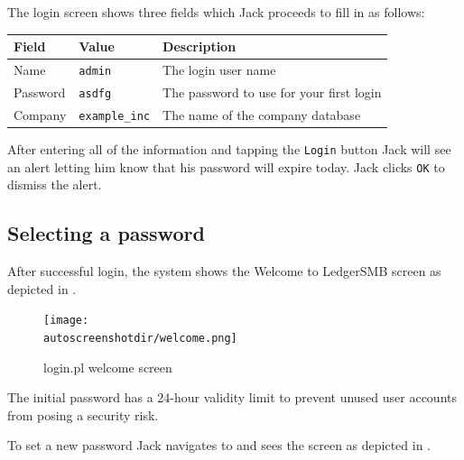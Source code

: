 The login screen shows three fields which Jack proceeds to fill in as follows:

\begin{longtable}{ llp{6cm} }
        Field & Value & Description \\ \hline
        \endhead
        Name & \texttt{admin} & The login user name\\
        Password & \texttt{asdfg} & The password to use for your first login\\
        Company & \texttt{example\_inc} & The name of the company database \\
\end{longtable}


After entering all of the information and tapping the \texttt{Login} button Jack will see an alert letting
him know that his password will expire today.  Jack clicks \texttt{OK} to dismiss the alert.

\subsection{Selecting a password}
\label{subsec-first-login-password}

After successful login, the system shows the Welcome to LedgerSMB  screen as depicted in
.

\begin{figure}[h]
        \centering
        \texttt{[image: \\autoscreenshotdir/welcome.png]}
        \caption{login.pl welcome screen}
        \label{fig:login-welcome-screen}
\end{figure}

The
initial password has a 24-hour validity limit to prevent unused user accounts from posing
a security risk.  

To set a new password Jack navigates to  and sees the 
screen as depicted in .

